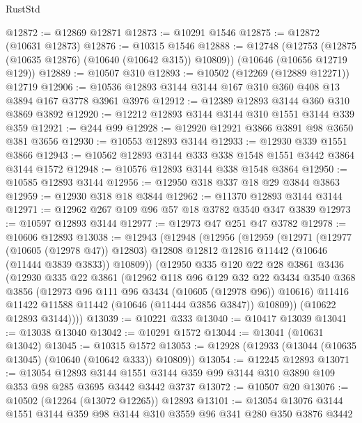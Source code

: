 \begin{lexlean}{RustStd}
\begin{coremodule}
@12872 := @12869 @12871
@12873 := @10291 @1546
@12875 := @12872 (@10631 @12873)
@12876 := @10315 @1546
@12888 := @12748
    (@12753 (@12875 (@10635 @12876) (@10640 (@10642 @315)) @10809))
    (@10646 (@10656 @12719 @129))
@12889 := @10507 @310
@12893 := @10502 (@12269 (@12889 @12271)) @12719
@12906 := @10536 @12893 @3144 @3144 @167 @310 @360 @408 @13 @3894 @167 @3778 @3961 @3976
@12912 := @12389 @12893 @3144 @360 @310 @3869 @3892
@12920 := @12212 @12893 @3144 @3144 @310 @1551 @3144 @339 @359
@12921 := @244 @99
@12928 := @12920 @12921 @3866 @3891 @98 @3650 @381 @3656
@12930 := @10553 @12893 @3144
@12933 := @12930 @339 @1551 @3866
@12943 := @10562 @12893 @3144 @333 @338 @1548 @1551 @3442 @3864 @3144 @1572
@12948 := @10576 @12893 @3144 @338 @1548 @3864
@12950 := @10585 @12893 @3144
@12956 := @12950 @318 @337 @18 @29 @3844 @3863
@12959 := @12930 @318 @18 @3844
@12962 := @11370 @12893 @3144 @3144
@12971 := @12962 @267 @109 @96 @57 @18 @3782 @3540 @347 @3839
@12973 := @10597 @12893 @3144
@12977 := @12973 @47 @251 @47 @3782
@12978 := @10606 @12893
@13038 := @12943
    (@12948
      (@12956
        (@12959
          (@12971
            (@12977 (@10605 (@12978 @47)) @12803)
            @12808
            @12812
            @12816
            @11442
            (@10646 (@11444 @3839 @3833))
            @10809))
        (@12950
          @335
          @120
          @22
          @28
          @3861
          @3436
          (@12930
            @335
            @22
            @3861
            (@12962
              @118
              @96
              @129
              @32
              @22
              @3434
              @3540
              @368
              @3856
              (@12973 @96 @111 @96 @3434 (@10605 (@12978 @96)) @10616)
              @11416
              @11422
              @11588
              @11442
              (@10646 (@11444 @3856 @3847))
              @10809))
          (@10622 @12893 @3144))))
@13039 := @10221 @333
@13040 := @10417 @13039
@13041 := @13038 @13040
@13042 := @10291 @1572
@13044 := @13041 (@10631 @13042)
@13045 := @10315 @1572
@13053 := @12928 (@12933 (@13044 (@10635 @13045) (@10640 (@10642 @333)) @10809))
@13054 := @12245 @12893
@13071 := @13054
    @12893
    @3144
    @1551
    @3144
    @359
    @99
    @3144
    @310
    @3890
    @109
    @353
    @98
    @285
    @3695
    @3442
    @3442
    @3737
@13072 := @10507 @20
@13076 := @10502 (@12264 (@13072 @12265)) @12893
@13101 := @13054
    @13076
    @3144
    @1551
    @3144
    @359
    @98
    @3144
    @310
    @3559
    @96
    @341
    @280
    @350
    @3876
    @3442

\end{coremodule}
\end{lexlean}
